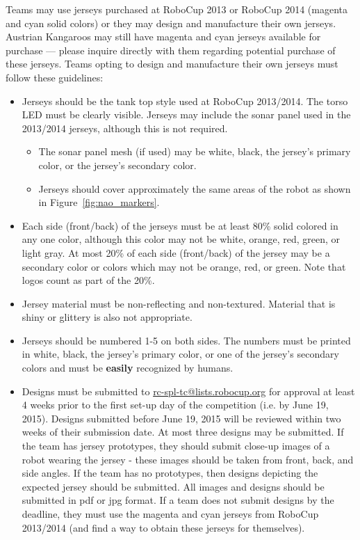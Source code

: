 \documentclass[12pt]{article}
\begin{document}
Teams may use jerseys purchased at RoboCup 2013 or RoboCup 2014 (magenta and cyan solid colors) or they may design and manufacture their own jerseys.  Austrian Kangaroos may still have magenta and cyan jerseys available for purchase --- please inquire directly with them regarding potential purchase of these jerseys.  Teams opting to design and manufacture their own jerseys must follow these guidelines:
\begin{itemize}
\item Jerseys should be the tank top style used at RoboCup 2013/2014.  The torso LED must be clearly visible.  Jerseys may include the sonar panel used in the 2013/2014 jerseys, although this is not required.
	\begin{itemize}
	\item The sonar panel mesh (if used) may be white, black, the jersey's primary color, or the jersey's secondary color.
	\item Jerseys should cover approximately the same areas of the robot as shown in Figure~\ref{fig:nao_markers}.
	\end{itemize}
\item Each side (front/back) of the jerseys must be at least 80\% solid colored in any one color, although this color may not be white, orange, red, green, or light gray.  At most 20\% of each side (front/back) of the jersey may be a secondary color or colors which may not be orange, red, or green.  Note that logos count as part of the 20\%.
\item Jersey material must be non-reflecting and non-textured.  Material that is shiny or glittery is also not appropriate.
\item Jerseys should be numbered 1-5 on both sides.  The numbers must be printed in white, black, the jersey's primary color, or one of the jersey's secondary colors and must be {\bf easily} recognized by humans.
\item Designs must be submitted to \url{rc-spl-tc@lists.robocup.org} for approval at least 4 weeks prior to the first set-up day of the competition (i.e. by June 19, 2015).  Designs submitted before June 19, 2015 will be reviewed within two weeks of their submission date.  At most three designs may be submitted. If the team has jersey prototypes, they should submit close-up images of a robot wearing the jersey - these images should be taken from front, back, and side angles.  If the team has no prototypes, then designs depicting the expected jersey should be submitted.  All images and designs should be submitted in pdf or jpg format.  If a team does not submit designs by the deadline, they must use the magenta and cyan jerseys from RoboCup 2013/2014 (and find a way to obtain these jerseys for themselves).
\end{itemize}
\end{document}
